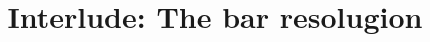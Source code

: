 \documentclass{ximera}
\title{Interlude: The bar resolugion}
\begin{document}
\begin{abstract}

\end{abstract}
\maketitle

\end{document}
